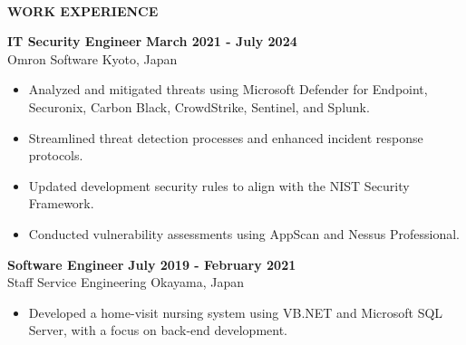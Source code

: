 \begin{flushleft}
    \hrulefill \\
    \begin{large}
        \begin{center}\textbf{WORK EXPERIENCE}\end{center}
    \end{large} 
\end{flushleft}
\textbf{IT Security Engineer} \hfill \textbf{March 2021 - July 2024} \\
Omron Software \hfill Kyoto, Japan
\begin{itemize}
    \item Analyzed and mitigated threats using Microsoft Defender for Endpoint, Securonix, Carbon Black, CrowdStrike, Sentinel, and Splunk.
    \item Streamlined threat detection processes and enhanced incident response protocols.
    \item Updated development security rules to align with the NIST Security Framework.
    \item Conducted vulnerability assessments using AppScan and Nessus Professional.
\end{itemize}
\textbf{Software Engineer} \hfill \textbf{July 2019 - February 2021} \\
Staff Service Engineering \hfill Okayama, Japan
\begin{itemize}
    \item Developed a home-visit nursing system using VB.NET and Microsoft SQL Server, with a focus on back-end development.
\end{itemize}